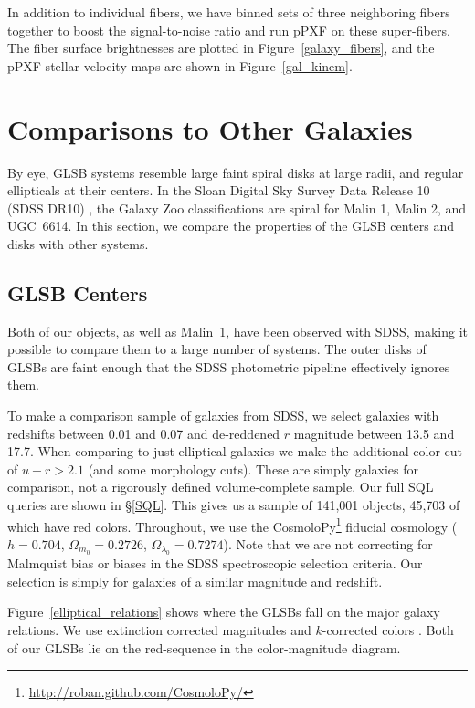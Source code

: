 \documentclass[12pt,preprint]{aastex}
\begin{document}
In addition to individual fibers, we have binned sets of three neighboring fibers together to boost the signal-to-noise ratio and run pPXF on these super-fibers. The fiber surface brightnesses are plotted in Figure~\ref{galaxy_fibers}, and the pPXF stellar velocity maps are shown in Figure~\ref{gal_kinem}.



\section{Comparisons to Other Galaxies}\label{sec:compare_gals}

By eye, GLSB systems resemble large faint spiral disks at large radii, and regular ellipticals at their centers.
In the Sloan Digital Sky Survey Data Release 10 (SDSS DR10) \citep{Ahn14}, the Galaxy Zoo classifications \citep{Willett13} are spiral for Malin 1, Malin 2, and UGC~6614.
In this section, we compare the properties of the GLSB centers and disks with other systems.


\subsection{GLSB Centers}\label{sec:centers}

Both of our objects, as well as Malin~1, have been observed with SDSS, making it possible to compare them to a large number of systems.
The outer disks of GLSBs are faint enough that the SDSS photometric pipeline effectively ignores them.


To make a comparison sample of galaxies from SDSS, we select galaxies with redshifts between 0.01 and 0.07 and de-reddened $r$ magnitude between 13.5 and 17.7.
When comparing to just elliptical galaxies we make the additional color-cut of $u-r > 2.1$ (and some morphology cuts).
These are simply galaxies for comparison, not a rigorously defined volume-complete sample.
Our full SQL queries are shown in \S\ref{SQL}.
This gives us a sample of 141,001 objects, 45,703 of which have red colors.
Throughout, we use the CosmoloPy\footnote{\url{http://roban.github.com/CosmoloPy/}} fiducial cosmology ($h=0.704$, $\Omega_{m_0}=0.2726$, $\Omega_{\lambda_0}=0.7274$).
Note that we are not correcting for Malmquist bias or biases in the SDSS spectroscopic selection criteria.
Our selection is simply for galaxies of a similar magnitude and redshift.


Figure~\ref{elliptical_relations} shows where the GLSBs fall on the major galaxy relations.
We use extinction corrected magnitudes and $k$-corrected colors \citep{Chilingarian10}.
Both of our GLSBs lie on the red-sequence in the color-magnitude diagram.
\end{document}

